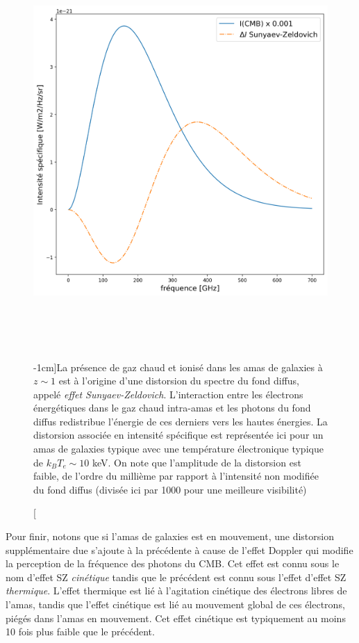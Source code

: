 \begin{figure}[htbp]
	\centering
		\includegraphics[height=15cm]{figs/SZ.png}
		\caption[L'effet SZ][-1cm]{La présence de gaz chaud et ionisé dans les amas de galaxies à $z\sim 1$ est à l'origine d'une distorsion du spectre du fond diffus, appelé \textit{effet Sunyaev-Zeldovich}. L'interaction entre les électrons énergétiques dans le gaz chaud intra-amas et les photons du fond diffus redistribue l'énergie de ces derniers vers les hautes énergies. La distorsion associée en intensité spécifique est représentée ici pour un amas de galaxies typique avec une température électronique typique de $k_B T_e \sim 10$ keV. On note que l'amplitude de la distorsion est faible, de l'ordre du millième par rapport à l'intensité non modifiée du fond diffus (divisée ici par 1000 pour une meilleure visibilité) }
	\label{f:SZ}
\end{figure}
Pour finir, notons que si l'amas de galaxies est en mouvement, une distorsion supplémentaire due s'ajoute à la précédente à cause de l'effet Doppler qui modifie la perception de la fréquence des photons du CMB. Cet effet est connu sous le nom d'effet SZ \textit{cinétique} tandis que le précédent est connu sous l'effet d'effet SZ \textit{thermique}. L'effet thermique est lié à l'agitation cinétique des électrons libres de l'amas, tandis que l'effet cinétique est lié au mouvement global de ces électrons, piégés dans l'amas en mouvement. Cet effet cinétique est typiquement au moins 10 fois plus faible que le précédent.


